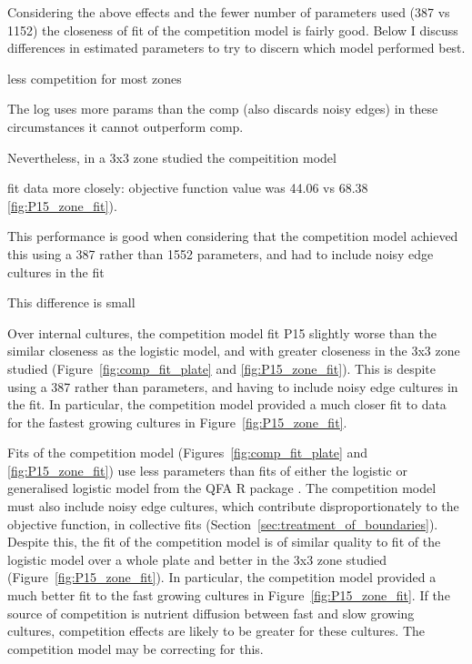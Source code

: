 Considering the above effects and the fewer number of parameters used
(387 vs 1152) the closeness of fit of the competition model is fairly
good. Below I discuss differences in estimated parameters to try to
discern which model performed best.



less competition for most zones

The log uses more params than the comp
(also discards noisy edges)
in these circumstances it cannot outperform comp.

Nevertheless, in a 3x3 zone studied the
compeitition model


fit data more closely: objective function value was
44.06 vs 68.38 \ref{fig:P15_zone_fit}).


This performance is good when considering that the competition model
achieved this using a 387 rather than 1552 parameters, and had to
include noisy edge cultures in the fit

This difference is small

Over internal cultures, the competition model fit P15 slightly worse
than the similar closeness as the logistic model, and with greater
closeness in the 3x3 zone studied (Figure~\ref{fig:comp_fit_plate} and
\ref{fig:P15_zone_fit}). This is despite using a 387 rather than
parameters, and having to include noisy edge cultures in the fit. In
particular, the competition model provided a much closer fit to data
for the fastest growing cultures in Figure~\ref{fig:P15_zone_fit}.



Fits of the competition model (Figures~\ref{fig:comp_fit_plate} and
\ref{fig:P15_zone_fit}) use less parameters than fits of either the
logistic or generalised logistic model from the QFA R package
\citep{qfa2016}. The competition model must also include noisy edge
cultures, which contribute disproportionately to the objective
function, in collective fits
(Section~\ref{sec:treatment_of_boundaries}). Despite this, the fit of
the competition model is of similar quality to fit of the logistic
model over a whole plate and better in the 3x3 zone studied
(Figure~\ref{fig:P15_zone_fit}). In particular, the competition model
provided a much better fit to the fast growing cultures in
Figure~\ref{fig:P15_zone_fit}. If the source of competition is
nutrient diffusion between fast and slow growing cultures, competition
effects are likely to be greater for these cultures. The competition
model may be correcting for this.

